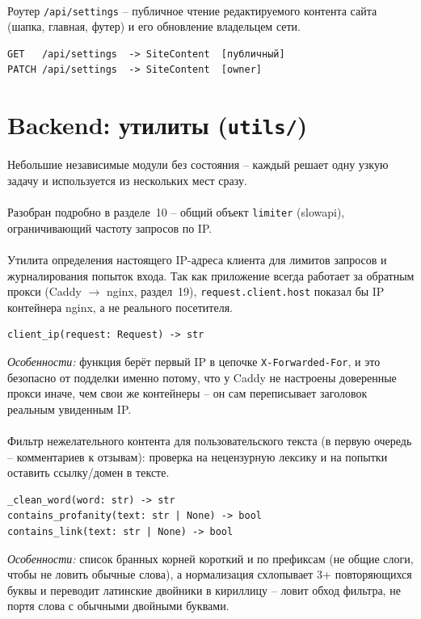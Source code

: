 \paragraph{}
Роутер \texttt{/api/settings} -- публичное чтение редактируемого
контента сайта (шапка, главная, футер) и его обновление владельцем сети.
\begin{verbatim}
GET   /api/settings  -> SiteContent  [публичный]
PATCH /api/settings  -> SiteContent  [owner]
\end{verbatim}

\section{Backend: утилиты (\texttt{utils/})}

Небольшие независимые модули без состояния -- каждый решает одну узкую
задачу и используется из нескольких мест сразу.

\paragraph{}
Разобран подробно в разделе~10 -- общий объект \texttt{limiter}
(slowapi), ограничивающий частоту запросов по IP.

\paragraph{}
Утилита определения настоящего IP-адреса клиента для лимитов запросов и
журналирования попыток входа. Так как приложение всегда работает за
обратным прокси (Caddy $\to$ nginx, раздел~19),
\texttt{request.client.host} показал бы IP контейнера nginx, а не
реального посетителя.
\begin{verbatim}
client_ip(request: Request) -> str
\end{verbatim}
\textit{Особенности:} функция берёт первый IP в цепочке
\texttt{X-Forwarded-For}, и это безопасно от подделки именно потому, что
у Caddy не настроены доверенные прокси иначе, чем свои же контейнеры --
он сам переписывает заголовок реальным увиденным IP.

\paragraph{}
Фильтр нежелательного контента для пользовательского текста (в первую
очередь -- комментариев к отзывам): проверка на нецензурную лексику и на
попытки оставить ссылку/домен в тексте.
\begin{verbatim}
_clean_word(word: str) -> str
contains_profanity(text: str | None) -> bool
contains_link(text: str | None) -> bool
\end{verbatim}
\textit{Особенности:} список бранных корней короткий и по префиксам (не
общие слоги, чтобы не ловить обычные слова), а нормализация схлопывает
3+ повторяющихся буквы и переводит латинские двойники в кириллицу --
ловит обход фильтра, не портя слова с обычными двойными буквами.

